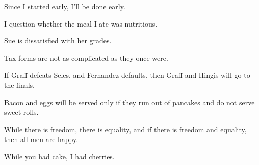 \begin{enumerate}
\begin{statement}{Since I started early, I’ll be done early.}
\end{statement}

\begin{statement}{I question whether the meal I ate was nutritious.}
\end{statement}

\begin{statement}{Sue is dissatisfied with her grades.}
\end{statement}

\begin{statement}{Tax forms are not as complicated as they once were.}
\end{statement}

\begin{statement}{If Graff defeats Seles, and Fernandez defaults, then Graff and Hingis will go to the finals.}
\end{statement}

\begin{statement}{Bacon and eggs will be served only if they run out of pancakes and do not serve sweet rolls.}
\end{statement}

\begin{statement}{While there is freedom, there is equality, and if there is freedom and equality, then all men are happy.}
\end{statement}

\begin{statement}{While you had cake, I had cherries.}
\end{statement}


\end{enumerate}
